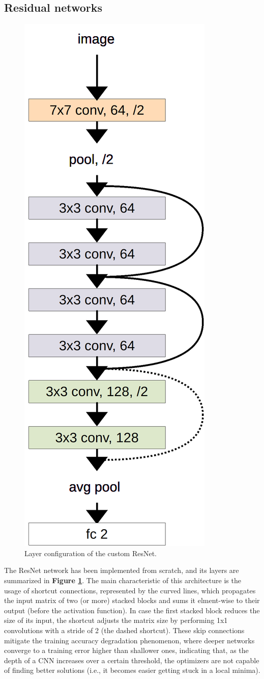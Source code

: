 
\subsection{Residual networks} %

\begin{figure}[ht!]
    \centering
    \includegraphics[height=0.65\linewidth, angle=90]{images/convLayers.png}
    \caption{Layer configuration of the custom ResNet.}
    \label{fig:resnet_layers}
\end{figure}
\noindent
The ResNet network has been implemented from scratch, and its layers are summarized in \textbf{Figure \ref{fig:resnet_layers}}. The main characteristic of this architecture is the usage of shortcut connections, represented by the curved lines, which propagates the input matrix of two (or more) stacked blocks and sums it elment-wise to their output (before the activation function). In case the first stacked block reduces the size of its input, the shortcut adjusts the matrix size by performing 1x1 convolutions with a stride of 2 (the dashed shortcut).
These skip connections mitigate the training accuracy degradation phenomenon, where deeper networks converge to a training error higher than shallower ones, indicating that, as the depth of a CNN increases over a certain threshold, the optimizers are not capable of finding better solutions (i.e., it becomes easier getting stuck in a local minima).\\

